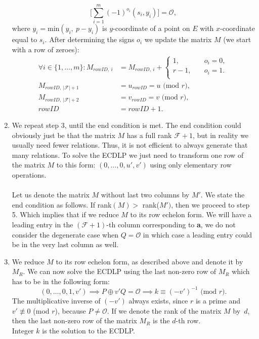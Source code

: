 \documentclass[thesis=M,english]{FITthesis}[2012/10/20]
\theoremstyle{remark}
\theoremstyle{definition}
\begin{document}
\begin{enumerate}
$$
\bigg[\sum_{i=1}^m(-1)^{o_i}(s_i, y_i) \bigg] = \mathcal{O}, 
$$
where $y_i = \text{min}(y_i,\ p - y_i)$ is $y$-coordinate of a point on $E$ with $x$-coordinate equal to $s_i$. After determining the signs $o_i$ we update the matrix $M$ (we start with a row of zeroes):
\begin{align*}
\forall i \in \{1,\ldots,m\}: M_{rowID,\ i} &= M_{rowID,\ i} + \begin{cases} 1, \quad &o_i = 0, \\
r-1, \quad &o_i = 1. \\
\end{cases}\\
M_{rowID,\ |\mathcal{F}| + 1} &= u_{rowID} = u \text{ (mod $r$)}, \\
M_{rowID,\ |\mathcal{F}| + 2} &= v_{rowID} = v \text{ (mod $r$)}, \\
rowID &= rowID + 1.
\end{align*}
\item We repeat step 3, until the end condition is met. The end condition could obviously just be that the matrix $M$ has a full rank $\mathcal{F} + 1$, but in reality we usually need fewer relations. Thus, it is not efficient to always generate that many relations. To solve the ECDLP we just need to transform one row of the matrix $M$ to this form: $(0, \ldots, 0,u',v')$ using only elementary row operations. \\ \\
\noindent Let us denote the matrix $M$ without last two columns by $M'$. We state the end condition as follows. If rank$(M) > $ rank($M')$, then we proceed to step 5. Which implies that if we reduce $M$ to its row echelon form. We will have a leading entry in the $(\mathcal{F} + 1)$-th column corresponding to \textbf{a}, we do not consider the degenerate case when $Q = \mathcal{O}$ in which case a leading entry could be in the very last column as well.
\item We reduce $M$ to its row echelon form, as described above and denote it by $M_R$. We can now solve the ECDLP using the last non-zero row of $M_R$ which has to be in the following form:
$$
(0, \ldots, 0, 1, v') \implies P \oplus v'Q = \mathcal{O} \implies k \equiv (-v')^{-1} \text{ (mod $r$)}.
$$
The multiplicative inverse of $(-v')$ always exists, since $r$ is a prime and $v' \not\equiv 0$ (mod $r$), because $P \neq \mathcal{O}$. If we denote the rank of the matrix $M$ by~$d$, then the last non-zero row of the matrix $M_R$ is the $d$-th row. \\ Integer $k$ is the solution to the ECDLP.
\end{enumerate}
\end{document}
